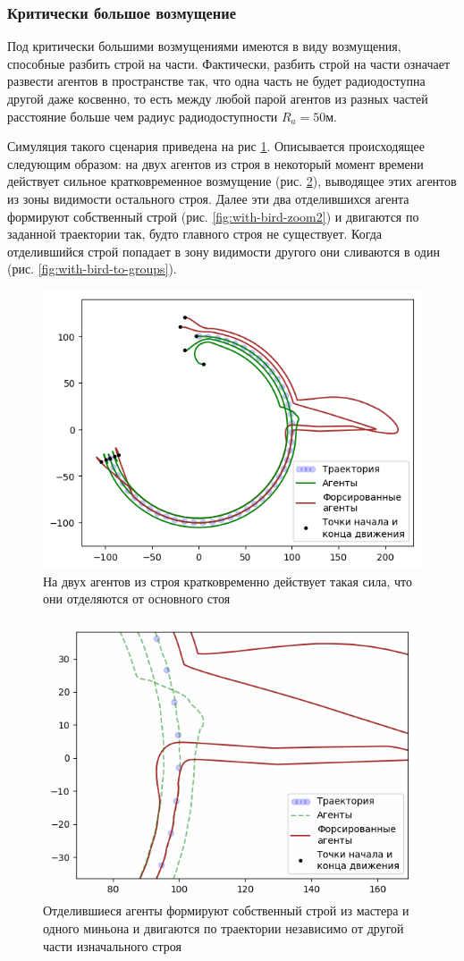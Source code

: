 \documentclass[a4paper, 14pt]{extarticle}
\let\Oldsubsubsection\subsubsection
\renewcommand{\subsubsection}{\FloatBarrier\Oldsubsubsection}
\begin{document}
\subsubsection{Критически большое возмущение}
Под критически большими возмущениями имеются в виду возмущения, способные разбить строй на части. Фактически, разбить строй на части означает развести агентов в пространстве так, что одна часть не будет радиодоступна другой даже косвенно, то есть между любой парой агентов из разных частей расстояние больше чем радиус радиодоступности $R_a = 50 \text{м}$. \par
Симуляция такого сценария приведена на рис \ref{fig:with-bird}. Описывается происходящее следующим образом: на двух агентов из строя в некоторый момент времени действует сильное кратковременное возмущение (рис.  \ref{fig:with-bird-zoom1}), выводящее этих агентов из зоны видимости остального строя. Далее эти два отделившихся агента формируют собственный строй (рис. \ref{fig:with-bird-zoom2}) и двигаются по заданной траектории так, будто главного строя не существует. Когда отделившийся строй попадает в зону видимости другого они сливаются в один (рис. \ref{fig:with-bird-to-groups}).
\begin{figure}
	\centering
	\includegraphics[width=0.7\linewidth]{platoon/with-bird}
	\caption{На двух агентов из строя кратковременно действует такая сила, что они отделяются от основного стоя}
	\label{fig:with-bird}
\end{figure}
\begin{figure}
	\centering
	\includegraphics[width=0.7\linewidth]{platoon/with-bird-zoom1}
	\caption{Отделившиеся агенты формируют собственный строй из мастера и одного миньона и двигаются по траектории независимо от другой части изначального строя}
	\label{fig:with-bird-zoom1}
\end{figure}
\end{document}
